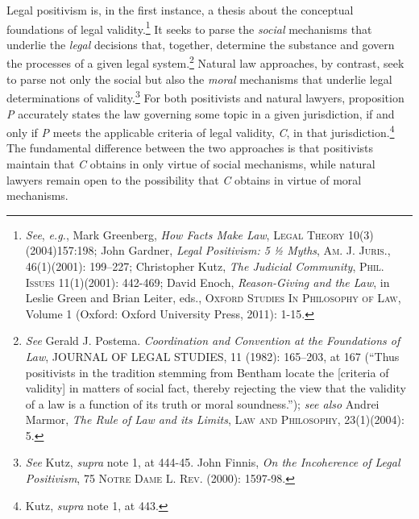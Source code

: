 Legal positivism is, in the first instance, a thesis about the
conceptual foundations of legal validity.\footnote{\emph{See},
  \emph{e.g.}, Mark Greenberg, \emph{How Facts Make Law}, \textsc{Legal
  Theory} 10(3)(2004)157:198; John Gardner, \emph{Legal Positivism: 5 ½
  Myths}, A\textsc{m. J. Juris}., 46(1)(2001): 199--227; Christopher
  Kutz, \emph{The Judicial Community}, \textsc{Phil. Issues}
  11(1)(2001): 442-469; David Enoch, \emph{Reason-Giving and the Law},
  in Leslie Green and Brian Leiter, eds., \textsc{Oxford Studies In
  Philosophy of Law}, Volume 1 (Oxford: Oxford University Press, 2011):
  1-15.} It seeks to parse the \emph{social} mechanisms that underlie
the \emph{legal} decisions that, together, determine the substance and
govern the processes of a given legal system.\footnote{\emph{See} Gerald
  J. Postema. \emph{Coordination and Convention at the Foundations of
  Law}, JOURNAL OF LEGAL STUDIES, 11 (1982): 165--203, at 167 (``Thus
  positivists in the tradition stemming from Bentham locate the
  {[}criteria of validity{]} in matters of social fact, thereby
  rejecting the view that the validity of a law is a function of its
  truth or moral soundness.''); \emph{see also} Andrei Marmor, \emph{The
  Rule of Law and its Limits}, \textsc{Law and Philosophy}, 23(1)(2004):
  5.} Natural law approaches, by contrast, seek to parse not only the
social but also the \emph{moral} mechanisms that underlie legal
determinations of validity.\footnote{\emph{See} Kutz, \emph{supra} note
  1, at 444-45. John Finnis, \emph{On the Incoherence of Legal
  Positivism}, 75 \textsc{Notre Dame L. Rev.} (2000): 1597-98.} For both
positivists and natural lawyers, proposition \emph{P} accurately states
the law governing some topic in a given jurisdiction, if and only if
\emph{P} meets the applicable criteria of legal validity, \emph{C}, in
that jurisdiction.\footnote{Kutz, \emph{supra} note 1, at 443.} The
fundamental difference between the two approaches is that positivists
maintain that \emph{C} obtains in only virtue of social mechanisms,
while natural lawyers remain open to the possibility that \emph{C}
obtains in virtue of moral mechanisms.

